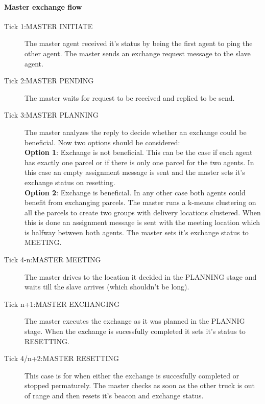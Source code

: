 \documentclass[../main.tex]{subfiles}
\begin{document}
\paragraph{Master exchange flow}
\begin{description}
	\item [Tick 1:MASTER INITIATE]
	The master agent received it's status by being the first agent to ping the other agent.
	The master sends an exchange request message to the slave agent.
	\item[Tick 2:MASTER PENDING]
	The master waits for request to be received and replied to be send.
	\item[Tick 3:MASTER PLANNING]
	The master analyzes the reply to decide whether an exchange could be beneficial.
	Now two options should be considered: \\
	\textbf{Option 1}: Exchange is not beneficial.
	This can be the case if each agent has exactly one parcel or if there is only one parcel for the two agents.
	In this case an empty assignment message is sent and the master sets it's exchange status on resetting.
	\\
	\textbf{Option 2}: Exchange is beneficial.
	In any other case both agents could benefit from exchanging parcels.
	The master runs a k-means clustering on all the parcels to create two groups with delivery locations clustered.
	When this is done an assignment message is sent with the meeting location which is halfway between both agents.
	The master sets it's exchange status to MEETING.
	\item[Tick 4-n:MASTER MEETING]
	The master drives to the location it decided in the PLANNING stage and waits till the slave arrives (which shouldn't be long).
	\item[Tick n+1:MASTER EXCHANGING]
	The master executes the exchange as it was planned in the PLANNIG stage.
	When the exchange is sucessfully completed it sets it's status to RESETTING.
	\item[Tick 4/n+2:MASTER RESETTING] 
	This case is for when either the exchange is succesfully completed or stopped permaturely.
	The master checks as soon as the other truck is out of range and then resets it's beacon and exchange status.
\end{description}
\end{document}
